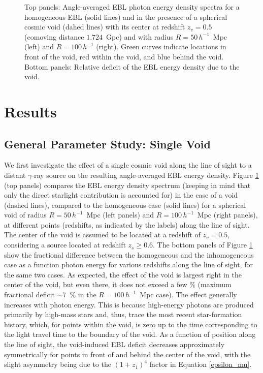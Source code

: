 \documentclass{aastex6}
\begin{document}
\begin{figure}[ht]
\caption{Top panels: Angle-averaged EBL photon energy density spectra for a homogeneous EBL (solid lines) 
and in the presence of a spherical cosmic void (dahed lines) with its center at redshift $z_v = 0.5$ 
(comoving distance $1.724$~Gpc) and with radius $R = 50 \, h^{-1}$~Mpc (left) and $R = 100 \, h^{-1}$ (right). 
Green curves indicate locations in front of the void, red within the void, and blue behind the void. 
Bottom panels: Relative deficit of the EBL energy density due to the void. 
\label{fig:EBLdensities1}}
\end{figure}


\section{Results}
\label{Results}

\subsection{General Parameter Study: Single Void}
\label{parameterstudy}

We first investigate the effect of a single
cosmic void along the line of sight to a distant $\gamma$-ray source
on the resulting angle-averaged EBL energy density. Figure \ref{fig:EBLdensities1} (top panels) compares
the EBL energy density spectrum (keeping in mind that only the direct starlight contribution is accounted 
for) in the case of a void (dashed lines), compared to the homogeneous case (solid lines) for a spherical 
void of radius $R = 50 \, h^{-1}$~Mpc (left panels) and $R = 100 \, h^{-1}$~Mpc (right panels), at different
points (redshifts, as indicated by the labels) along the line of sight. The center of the void is assumed 
to be located at a redshift of $z_v = 0.5$, considering a source located at redshift $z_s \ge 0.6$. The
bottom panels of Figure \ref{fig:EBLdensities1} show the fractional difference between the homogeneous and
the inhomogeneous case as a function photon energy for various redshifts along the line of sight, for the
same two cases. As expected,
the effect of the void is largest right in the center of the void, but even there, 
it does not exceed a few \% (maximum fractional deficit $\sim 7$~\% in the $R = 100 \, h^{-1}$~Mpc case). 
The effect generally increases with photon energy. This is because high-energy photons are produced primarily 
by high-mass stars and, thus, trace the most recent star-formation history, which, for points within the 
void, is zero up to the time corresponding to the light travel time to the boundary of the void. As a 
function of position along the line of sight, the void-induced EBL deficit decreases approximately 
symmetrically for points in front of and behind the center of the void, with the slight asymmetry 
being due to the $(1 + z_1)^4$ factor in Equation \ref{epsilon_mu}. 
\end{document}
